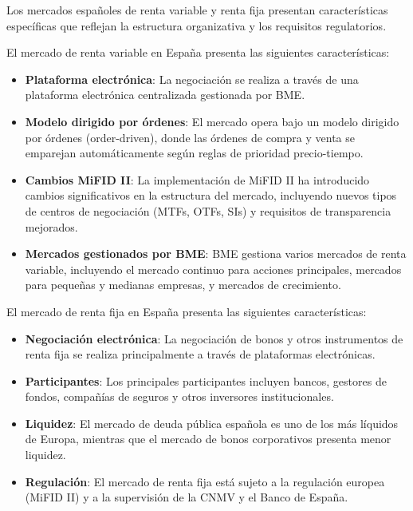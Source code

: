 Los mercados españoles de renta variable y renta fija presentan características específicas que reflejan la estructura organizativa y los requisitos regulatorios.

\begin{proposicion}
El mercado de renta variable en España presenta las siguientes características:
\begin{itemize}
\item \textbf{Plataforma electrónica}: La negociación se realiza a través de una plataforma electrónica centralizada gestionada por BME.
\item \textbf{Modelo dirigido por órdenes}: El mercado opera bajo un modelo dirigido por órdenes (order-driven), donde las órdenes de compra y venta se emparejan automáticamente según reglas de prioridad precio-tiempo.
\item \textbf{Cambios MiFID II}: La implementación de MiFID II ha introducido cambios significativos en la estructura del mercado, incluyendo nuevos tipos de centros de negociación (MTFs, OTFs, SIs) y requisitos de transparencia mejorados.
\item \textbf{Mercados gestionados por BME}: BME gestiona varios mercados de renta variable, incluyendo el mercado continuo para acciones principales, mercados para pequeñas y medianas empresas, y mercados de crecimiento.
\end{itemize}
\end{proposicion}

\begin{proposicion}
El mercado de renta fija en España presenta las siguientes características:
\begin{itemize}
\item \textbf{Negociación electrónica}: La negociación de bonos y otros instrumentos de renta fija se realiza principalmente a través de plataformas electrónicas.
\item \textbf{Participantes}: Los principales participantes incluyen bancos, gestores de fondos, compañías de seguros y otros inversores institucionales.
\item \textbf{Liquidez}: El mercado de deuda pública española es uno de los más líquidos de Europa, mientras que el mercado de bonos corporativos presenta menor liquidez.
\item \textbf{Regulación}: El mercado de renta fija está sujeto a la regulación europea (MiFID II) y a la supervisión de la CNMV y el Banco de España.
\end{itemize}
\end{proposicion}

